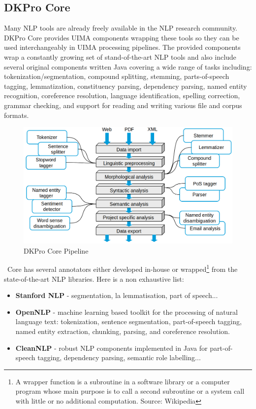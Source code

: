\subsection{DKPro Core}
Many NLP tools are already freely available in the NLP research community. DKPro Core \cite{TUD-CS-2014-0864} provides UIMA components wrapping these tools so they can be used interchangeably in UIMA processing pipelines. The provided components wrap a constantly growing set of stand-of-the-art NLP tools and also include several original components written Java covering a wide range of tasks including: \gls{tokenization}/segmentation, compound splitting, stemming, \gls{parts-of-speech} tagging, lemmatization, constituency parsing, dependency parsing, named entity recognition, coreference resolution, language identification, spelling correction, grammar checking, and support for reading and writing various file and corpus formats. 
\
\begin{figure}[H]
    \centering
    \includegraphics[width=1\textwidth]{fig/dkpro-pipeline.png}
    \caption[Short caption]{DKPro Core Pipeline}
    \label{fig:dkpro-pipeline}
\end{figure}
\
Core has several annotators either developed in-house or wrapped\footnote{A wrapper function is a subroutine in a software library or a computer program whose main purpose is to call a second subroutine or a system call with little or no additional computation. Source: Wikipedia} from the state-of-the-art NLP libraries. Here is a non exhaustive list:
\begin{itemize}
  \item \textbf{Stanford NLP} - segmentation, la lemmatisation, part of speech...
  \item \textbf{OpenNLP} - machine learning based toolkit for the processing of natural language text: tokenization, sentence segmentation, part-of-speech tagging, named entity extraction, chunking, parsing, and coreference resolution. 
  \item \textbf{CleanNLP} - robust NLP components implemented in Java for part-of-speech tagging, dependency parsing, semantic role labelling... 
\end{itemize}


